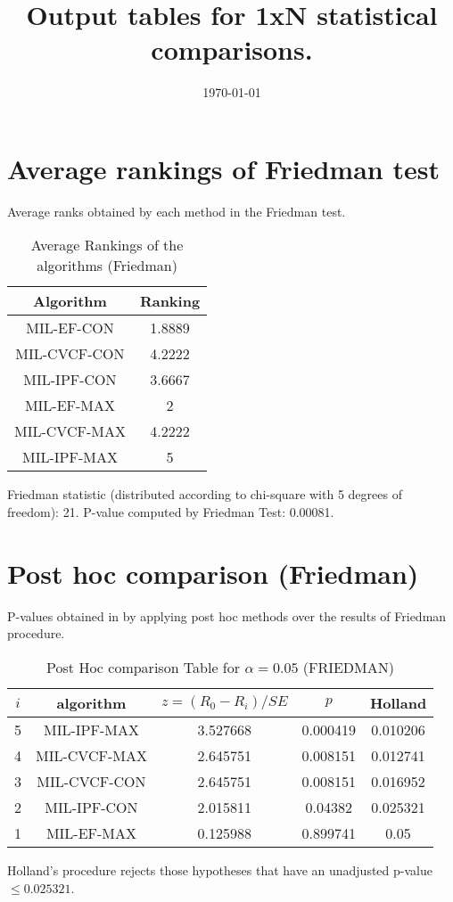 \documentclass[a4paper,10pt]{article}
\title{Output tables for 1xN statistical comparisons.}
\author{}
\date{\today}
\begin{document}
\begin{landscape}
\pagestyle{empty}
\maketitle
\thispagestyle{empty}

\section{Average rankings of Friedman test}


Average ranks obtained by each method in the Friedman test.

\begin{table}[!htp]
\centering
\begin{tabular}{|c|c|}\hline
Algorithm&Ranking\\\hline
MIL-EF-CON&1.8889\\MIL-CVCF-CON&4.2222\\MIL-IPF-CON&3.6667\\MIL-EF-MAX&2\\MIL-CVCF-MAX&4.2222\\MIL-IPF-MAX&5\\\hline\end{tabular}
\caption{Average Rankings of the algorithms (Friedman)}
\end{table}

Friedman statistic (distributed according to chi-square with 5 degrees of freedom): 21. \newline P-value computed by Friedman Test: 0.00081.\newline


\newpage

\section{Post hoc comparison (Friedman)}


P-values obtained in by applying post hoc methods over the results of Friedman procedure.

\begin{table}[!htp]
\centering\footnotesize
\begin{tabular}{ccccc}
$i$&algorithm&$z=(R_0 - R_i)/SE$&$p$&Holland\\
\hline5&MIL-IPF-MAX&3.527668&0.000419&0.010206\\4&MIL-CVCF-MAX&2.645751&0.008151&0.012741\\3&MIL-CVCF-CON&2.645751&0.008151&0.016952\\2&MIL-IPF-CON&2.015811&0.04382&0.025321\\1&MIL-EF-MAX&0.125988&0.899741&0.05\\\hline
\end{tabular}
\caption{Post Hoc comparison Table for $\alpha=0.05$ (FRIEDMAN)}
\end{table}Holland's procedure rejects those hypotheses that have an unadjusted p-value $\le0.025321$.



\end{landscape}
\end{document}
